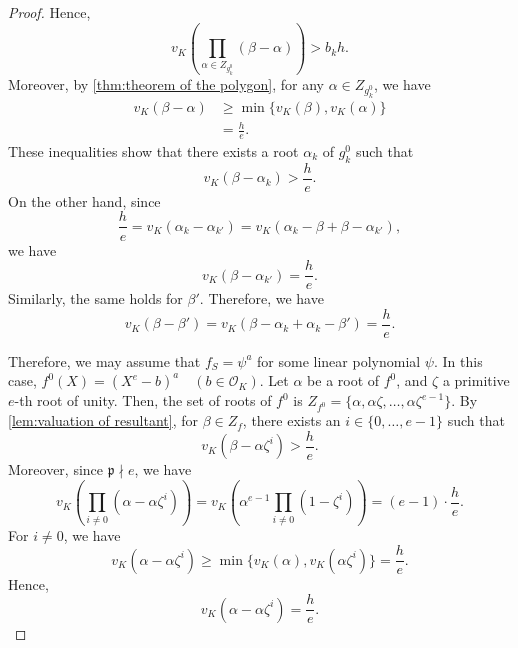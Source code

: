 \documentclass[10pt,a4paper]{amsart}
\numberwithin{equation}{section}
\begin{document}
\begin{proof}
    Hence, 
    \[
      v_K(\prod_{\alpha \in Z_{g_k^0}} (\beta - \alpha)) > b_k h. 
    \]
    Moreover, by \cref{thm:theorem of the polygon}, for any $\alpha \in Z_{g_k^0}$, we have 
    \begin{align}
      v_K(\beta - \alpha) &\ge \min\{v_K(\beta),v_K(\alpha)\} \\
      &=\frac{h}{e}. 
    \end{align}
    These inequalities show that there exists a root $\alpha_k$ of $g_k^0$ such that 
    \[
      v_K(\beta - \alpha_k) > \frac{h}{e}. 
    \]
    On the other hand, since
    \[
      \frac{h}{e} = v_K(\alpha_k - \alpha_{k'}) = v_K(\alpha_k - \beta + \beta - \alpha_{k'}), 
    \]
    we have 
    \[
      v_K(\beta - \alpha_{k'}) = \frac{h}{e}. 
    \]
    Similarly, the same holds for $\beta'$. Therefore, we have 
    \[
      v_K(\beta - \beta') = v_K(\beta - \alpha_k + \alpha_k - \beta') = \frac{h}{e}. 
    \]

    Therefore, we may assume that $f_S = \psi^a$ for some linear polynomial $\psi$. 
    In this case, $f^0(X) = (X^e - b)^a \quad (b \in \mathcal{O}_K)$. 
    Let $\alpha$ be a root of $f^0$, and $\zeta$ a primitive $e$-th root of unity. 
    Then, the set of roots of $f^0$ is $Z_{f^0} = \{\alpha,\alpha\zeta, \dots ,\alpha\zeta^{e-1}\}$. 
    By \cref{lem:valuation of resultant}, for $\beta \in Z_f$, there exists an $i \in \{0, \dots ,e-1\}$ such that 
    \[
      v_K(\beta - \alpha\zeta^i) > \frac{h}{e}. 
    \]
    Moreover, since $\mathfrak{p} \nmid e$, we have 
    \[
      v_K(\prod_{i \ne 0} (\alpha - \alpha\zeta^i)) = v_K(\alpha^{e - 1}\prod_{i \ne 0} (1 - \zeta^i)) = (e - 1) \cdot \frac{h}{e}. 
    \]
    For $i \ne 0$, we have 
    \[
      v_K(\alpha - \alpha\zeta^i) \ge \min\{v_K(\alpha),v_K(\alpha\zeta^i)\} = \frac{h}{e}. 
    \]
    Hence, 
    \[
      v_K(\alpha - \alpha\zeta^i) = \frac{h}{e} \label{formula:lem-1}. 
    \]


\end{proof}
\end{document}
